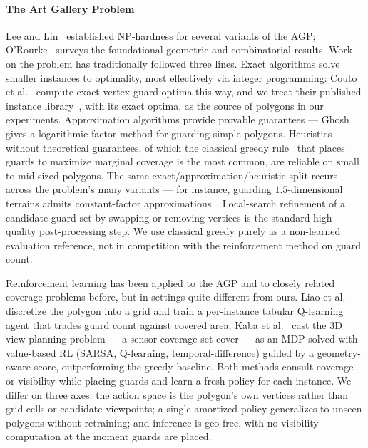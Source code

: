 \documentclass[preprint,10pt]{elsarticle}
\begin{document}
\paragraph{The Art Gallery Problem} Lee and Lin~\cite{LeeLin1986} established NP-hardness for several variants of the AGP; O'Rourke~\cite{ORourke1987AGT} surveys the foundational geometric and combinatorial results. Work on the problem has traditionally followed three lines. Exact algorithms solve smaller instances to optimality, most effectively via integer programming: Couto et al.~\cite{Couto2011ExactAGP} compute exact vertex-guard optima this way, and we treat their published instance library~\cite{art-gallery-instances-page}, with its exact optima, as the source of polygons in our experiments. Approximation algorithms provide provable guarantees --- Ghosh~\cite{Ghosh2010ApproxAGP} gives a logarithmic-factor method for guarding simple polygons. Heuristics without theoretical guarantees, of which the classical greedy rule~\cite{GonzalezBanos2001} that places guards to maximize marginal coverage is the most common, are reliable on small to mid-sized polygons. The same exact/approximation/heuristic split recurs across the problem's many variants --- for instance, guarding $1.5$-dimensional terrains admits constant-factor approximations~\cite{journals/siamcomp/Ben-MosheKM07,EMMS08}. Local-search refinement of a candidate guard set by swapping or removing vertices is the standard high-quality post-processing step. We use classical greedy purely as a non-learned evaluation reference, not in competition with the reinforcement method on guard count.

Reinforcement learning has been applied to the AGP and to closely related coverage problems before, but in settings quite different from ours. Liao et al.~\cite{Liao2025AGPRL} discretize the polygon into a grid and train a per-instance tabular Q-learning agent that trades guard count against covered area; Kaba et al.~\cite{Kaba2016ViewPlanning} cast the 3D view-planning problem --- a sensor-coverage set-cover --- as an MDP solved with value-based RL (SARSA, Q-learning, temporal-difference) guided by a geometry-aware score, outperforming the greedy baseline. Both methods consult coverage or visibility while placing guards and learn a fresh policy for each instance. We differ on three axes: the action space is the polygon's own vertices rather than grid cells or candidate viewpoints; a single amortized policy generalizes to unseen polygons without retraining; and inference is geo-free, with no visibility computation at the moment guards are placed.
\end{document}
